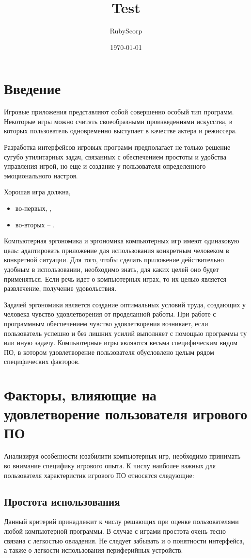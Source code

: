 \documentclass{article}
\title{Test}
\author{RubyScorp}
\date{\today}
\begin{document}
\section{Введение}
Игровые приложения представляют собой совершенно особый тип программ. Некоторые игры можно считать своеобразными произведениями искусства, в которых пользователь одновременно выступает в качестве актера и режиссера.

Разработка интерфейсов игровых программ предполагает не только решение сугубо утилитарных задач, связанных с обеспечением простоты и удобства управления игрой, но еще и создание у пользователя определенного эмоционального настроя.

\bigskip\noindent Хорошая игра должна,
\begin{itemize}
  \item во-первых, ,
  \item во-вторых -- .
\end{itemize}

Компьютерная эргономика и эргономика компьютерных игр имеют одинаковую цель: адаптировать приложение для использования конкретным человеком в конкретной ситуации. Для того, чтобы сделать приложение действительно удобным в использовании, необходимо знать, для каких целей оно будет применяться. Если речь идет о компьютерных играх, то их целью является развлечение, получение удовольствия.

Задачей эргономики является создание оптимальных условий труда, создающих у человека чувство удовлетворения от проделанной работы. При работе с программным обеспечением чувство удовлетворения возникает, если пользователь успешно и без лишних усилий выполняет с помощью программы ту или иную задачу. Компьютерные игры являются весьма специфическим видом ПО, в котором удовлетворение пользователя обусловлено целым рядом специфических факторов.

\section{Факторы, влияющие на удовлетворение пользователя игрового ПО}
Анализируя особенности юзабилити компьютерных игр, необходимо принимать во внимание специфику игрового опыта. К числу наиболее важных для пользователя характеристик игрового ПО относятся следующие:

\subsection{Простота использования}
Данный критерий принадлежит к числу решающих при оценке пользователями любой компьютерной программы. В случае с играми простота очень тесно связана с легкостью овладения. Не следует забывать и о понятности интерфейса, а также о легкости использования периферийных устройств.
\end{document}
